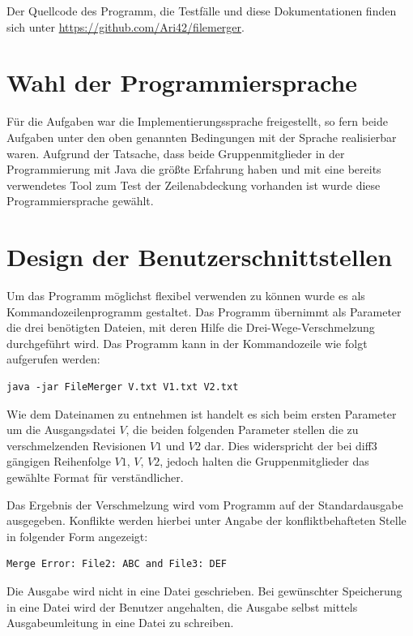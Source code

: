 \documentclass[a4paper,titlepage,12pt]{scrartcl}
\begin{document}
Der Quellcode des Programm, die Testfälle und diese Dokumentationen finden sich unter \url{https://github.com/Ari42/filemerger}.

\section{Wahl der Programmiersprache}
\label{sec:proglang}
Für die Aufgaben war die Implementierungssprache freigestellt, so fern beide Aufgaben unter den oben genannten Bedingungen mit der Sprache realisierbar waren.
Aufgrund der Tatsache, dass beide Gruppenmitglieder in der Programmierung mit Java die größte Erfahrung haben und mit \citep{www:ECLEMMA} eine bereits verwendetes Tool zum Test der Zeilenabdeckung vorhanden ist wurde diese Programmiersprache gewählt.

\section{Design der Benutzerschnittstellen}
\label{sec:design}
Um das Programm möglichst flexibel verwenden zu können wurde es als Kommandozeilenprogramm gestaltet.
Das Programm übernimmt als Parameter die drei benötigten Dateien, mit deren Hilfe die Drei-Wege-Verschmelzung durchgeführt wird. Das Programm kann in der Kommandozeile wie folgt aufgerufen werden:

\lstset{language=sh, numbers=none, xleftmargin=0pt}
\begin{lstlisting}
java -jar FileMerger V.txt V1.txt V2.txt
\end{lstlisting}
Wie dem Dateinamen zu entnehmen ist handelt es sich beim ersten Parameter um die Ausgangsdatei $V$,
die beiden folgenden Parameter stellen die zu verschmelzenden Revisionen $V1$ und $V2$ dar.
Dies widerspricht der bei diff3 gängigen Reihenfolge $V1$, $V$, $V2$, jedoch halten die Gruppenmitglieder das gewählte Format für verständlicher.

Das Ergebnis der Verschmelzung wird vom Programm auf der Standardausgabe ausgegeben. Konflikte werden hierbei unter Angabe der konfliktbehafteten Stelle in folgender Form angezeigt:

\begin{verbatim}
Merge Error: File2: ABC and File3: DEF
\end{verbatim}


Die Ausgabe wird nicht in eine Datei geschrieben. Bei gewünschter Speicherung in eine Datei wird der Benutzer angehalten, die Ausgabe selbst mittels Ausgabeumleitung in eine Datei zu schreiben.
\end{document}
